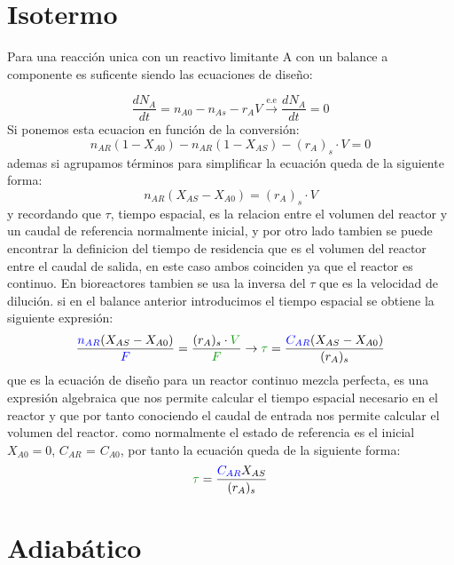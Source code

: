 \section{Isotermo}
\noindent Para una reacción unica con un reactivo limitante A con un balance a componente es suficente siendo las ecuaciones de diseño:

\begin{equation}
	\frac{dN_A}{dt} = n_{A0} - n_{As} - r_A V \xrightarrow{\text{e.e}} \frac{dN_A}{dt} = 0
\end{equation}
\noindent Si ponemos esta ecuacion en función de la conversión:
\begin{equation}
	n_{AR} (1-X_{A0}) - n_{AR} (1-X_{AS}) - (r_A)_s\cdot V = 0
\end{equation}
\noindent ademas si agrupamos términos para simplificar la ecuación queda de la siguiente forma:
\begin{equation}
	n_{AR} (X_{AS}-X_{A0}) = (r_A)_s\cdot V
\end{equation}
y recordando que $\tau$, tiempo espacial, es la relacion entre el volumen del reactor y un caudal de referencia normalmente inicial, y por otro lado tambien se puede encontrar la definicion del tiempo de residencia que es el volumen del reactor entre el caudal de salida,
en este caso ambos coinciden ya que el reactor es continuo. En bioreactores tambien se usa la inversa del $\tau$ que es la velocidad de dilución.
si en el balance anterior introducimos el tiempo espacial se obtiene la siguiente expresión:
\begin{equation}
	\frac{\textcolor{blue}{n_{AR}} (X_{AS}-X_{A0})}{\textcolor{blue}{F}} = \frac{(r_A)_s\cdot \textcolor{darkgreen}{V}}{\textcolor{darkgreen}{F}} \rightarrow \textcolor{darkgreen}{\tau} = \frac{\textcolor{blue}{C_{AR}}(X_{AS}-X_{A0})}{(r_A)_s}
\end{equation}
que es la ecuación de diseño para un reactor continuo mezcla perfecta, es una expresión algebraica que nos permite calcular el tiempo espacial necesario en el reactor y que por tanto conociendo el caudal  de entrada nos permite calcular el volumen del reactor. como normalmente el estado de referencia es el inicial $X_{A0}=0$, $C_{AR}$ = $C_{A0}$, por tanto la ecuación queda de la siguiente forma:
\begin{equation}
	\textcolor{darkgreen}{\tau} = \frac{\textcolor{blue}{C_{AR}}X_{AS}}{(r_A)_s}
\end{equation}
\section{Adiabático}

